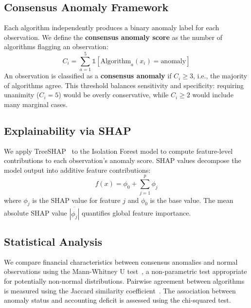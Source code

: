 \documentclass{ieeeaccess}
\begin{document}
\subsection{Consensus Anomaly Framework}
\label{subsec:consensus}

Each algorithm independently produces a binary anomaly label for each observation. We define the \textbf{consensus anomaly score} as the number of algorithms flagging an observation:
\begin{equation}
    C_i = \sum_{a=1}^{5} \mathbb{1}[\text{Algorithm}_a(x_i) = \text{anomaly}]
\end{equation}
An observation is classified as a \textbf{consensus anomaly} if $C_i \geq 3$, i.e., the majority of algorithms agree. This threshold balances sensitivity and specificity: requiring unanimity ($C_i = 5$) would be overly conservative, while $C_i \geq 2$ would include many marginal cases.

\subsection{Explainability via SHAP}
\label{subsec:shap}

We apply TreeSHAP~\cite{lundberg2017unified} to the Isolation Forest model to compute feature-level contributions to each observation's anomaly score. SHAP values decompose the model output into additive feature contributions:
\begin{equation}
    f(x) = \phi_0 + \sum_{j=1}^{p} \phi_j
\end{equation}
where $\phi_j$ is the SHAP value for feature $j$ and $\phi_0$ is the base value. The mean absolute SHAP value $\overline{|\phi_j|}$ quantifies global feature importance.

\subsection{Statistical Analysis}
\label{subsec:stats}

We compare financial characteristics between consensus anomalies and normal observations using the Mann-Whitney U test~\cite{mann1947test}, a non-parametric test appropriate for potentially non-normal distributions. Pairwise agreement between algorithms is measured using the Jaccard similarity coefficient~\cite{jaccard1912distribution}. The association between anomaly status and accounting deficit is assessed using the chi-squared test.

\end{document}
